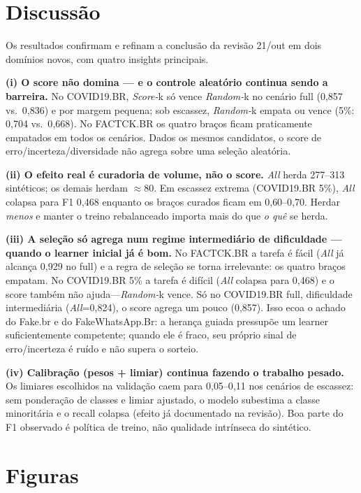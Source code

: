 \documentclass[conference]{IEEEtran}
\begin{document}
\section{Discuss\~ao}

Os resultados confirmam e refinam a conclus\~ao da revis\~ao 21/out em dois dom\'inios novos, com quatro insights principais.

\textbf{(i) O score n\~ao domina --- e o controle aleat\'orio continua sendo a barreira.} No COVID19.BR, \emph{Score-}k s\'o vence \emph{Random-}k no cen\'ario full (0{,}857 vs.\ 0{,}836) e por margem pequena; sob escassez, \emph{Random-}k empata ou vence (5\%: 0{,}704 vs.\ 0{,}668). No FACTCK.BR os quatro bra\c{c}os ficam praticamente empatados em todos os cen\'arios. Dados os mesmos candidatos, o score de erro/incerteza/diversidade n\~ao agrega sobre uma sele\c{c}\~ao aleat\'oria.

\textbf{(ii) O efeito real \'e curadoria de volume, n\~ao o score.} \emph{All} herda 277--313 sint\'eticos; os demais herdam $\approx$80. Em escassez extrema (COVID19.BR 5\%), \emph{All} colapsa para F1 0{,}468 enquanto os bra\c{c}os curados ficam em 0{,}60--0{,}70. Herdar \emph{menos} e manter o treino rebalanceado importa mais do que \emph{o qu\^e} se herda.

\textbf{(iii) A sele\c{c}\~ao s\'o agrega num regime intermedi\'ario de dificuldade --- quando o learner inicial j\'a \'e bom.} No FACTCK.BR a tarefa \'e f\'acil (\emph{All} j\'a alcan\c{c}a 0{,}929 no full) e a regra de sele\c{c}\~ao se torna irrelevante: os quatro bra\c{c}os empatam. No COVID19.BR 5\% a tarefa \'e dif\'icil (\emph{All} colapsa para 0{,}468) e o score tamb\'em n\~ao ajuda---\emph{Random-}k vence. S\'o no COVID19.BR full, dificuldade intermedi\'aria (\emph{All}=0{,}824), o score agrega um pouco (0{,}857). Isso ecoa o achado do Fake.br e do FakeWhatsApp.Br: a heran\c{c}a guiada pressup\~oe um learner suficientemente competente; quando ele \'e fraco, seu pr\'oprio sinal de erro/incerteza \'e ru\'ido e n\~ao supera o sorteio.

\textbf{(iv) Calibra\c{c}\~ao (pesos + limiar) continua fazendo o trabalho pesado.} Os limiares escolhidos na valida\c{c}\~ao caem para 0{,}05--0{,}11 nos cen\'arios de escassez: sem pondera\c{c}\~ao de classes e limiar ajustado, o modelo subestima a classe minorit\'aria e o recall colapsa (efeito j\'a documentado na revis\~ao). Boa parte do F1 observado \'e pol\'itica de treino, n\~ao qualidade intr\'inseca do sint\'etico.

\section{Figuras}
\end{document}
